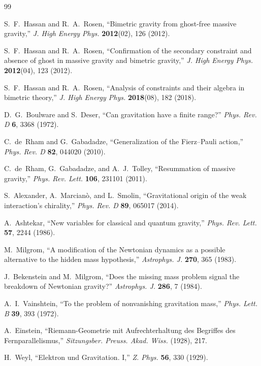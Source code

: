\documentclass[twocolumn]{iopjournal}
\begin{document}
\begin{thebibliography}{99}

S.~F.~Hassan and R.~A.~Rosen,
``Bimetric gravity from ghost-free massive gravity,''
\textit{J. High Energy Phys.} \textbf{2012}(02), 126 (2012).

S.~F.~Hassan and R.~A.~Rosen,
``Confirmation of the secondary constraint and absence of ghost in massive gravity and bimetric gravity,''
\textit{J. High Energy Phys.} \textbf{2012}(04), 123 (2012).

S.~F.~Hassan and R.~A.~Rosen,
``Analysis of constraints and their algebra in bimetric theory,''
\textit{J. High Energy Phys.} \textbf{2018}(08), 182 (2018).

D.~G.~Boulware and S.~Deser,
``Can gravitation have a finite range?''
\textit{Phys. Rev. D} \textbf{6}, 3368 (1972).

C.~de~Rham and G.~Gabadadze,
``Generalization of the Fierz--Pauli action,''
\textit{Phys. Rev. D} \textbf{82}, 044020 (2010).

C.~de~Rham, G.~Gabadadze, and A.~J.~Tolley,
``Resummation of massive gravity,''
\textit{Phys. Rev. Lett.} \textbf{106}, 231101 (2011).

S.~Alexander, A.~Marcian\`o, and L.~Smolin,
``Gravitational origin of the weak interaction's chirality,''
\textit{Phys. Rev. D} \textbf{89}, 065017 (2014).

A.~Ashtekar,
``New variables for classical and quantum gravity,''
\textit{Phys. Rev. Lett.} \textbf{57}, 2244 (1986).

M.~Milgrom,
``A modification of the Newtonian dynamics as a possible alternative to the hidden mass hypothesis,''
\textit{Astrophys. J.} \textbf{270}, 365 (1983).

J.~Bekenstein and M.~Milgrom,
``Does the missing mass problem signal the breakdown of Newtonian gravity?''
\textit{Astrophys. J.} \textbf{286}, 7 (1984).

A.~I.~Vainshtein,
``To the problem of nonvanishing gravitation mass,''
\textit{Phys. Lett. B} \textbf{39}, 393 (1972).

A.~Einstein,
``Riemann-Geometrie mit Aufrechterhaltung des Begriffes des Fernparallelismus,''
\textit{Sitzungsber. Preuss. Akad. Wiss.} (1928), 217.

H.~Weyl,
``Elektron und Gravitation. I,''
\textit{Z. Phys.} \textbf{56}, 330 (1929).

\end{thebibliography}
\end{document}
